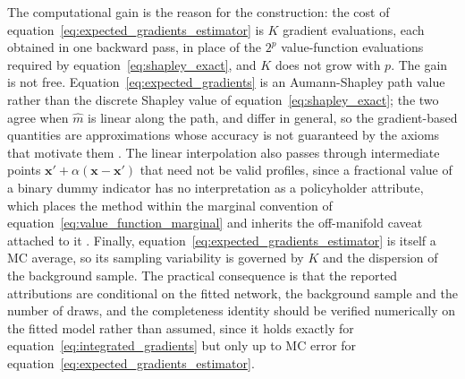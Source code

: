   \noindent
  The computational gain is the reason for the construction: the cost of
  equation~\eqref{eq:expected_gradients_estimator} is \(K\) gradient
  evaluations, each obtained in one backward pass, in place of the
  \(2^{p}\) value-function evaluations required by
  equation~\eqref{eq:shapley_exact}, and \(K\) does not grow with \(p\).
  The gain is not free. Equation~\eqref{eq:expected_gradients} is an
  Aumann-Shapley path value rather than the discrete Shapley value of
  equation~\eqref{eq:shapley_exact}; the two agree when \(\widehat{m}\) is
  linear along the path, and differ in general, so the gradient-based
  quantities are approximations whose accuracy is not guaranteed by the
  axioms that motivate them \citep{sundararajan2020many}. The linear
  interpolation also passes through intermediate points
  \(\mathbf{x}'+\alpha(\mathbf{x}-\mathbf{x}')\) that need not be valid
  profiles, since a fractional value of a binary dummy indicator has no
  interpretation as a policyholder attribute, which places the method
  within the marginal convention of
  equation~\eqref{eq:value_function_marginal} and inherits the
  off-manifold caveat attached to it \citep{hooker2021unrestricted}.
  Finally, equation~\eqref{eq:expected_gradients_estimator} is itself a MC
  average, so its sampling variability is governed by \(K\) and the
  dispersion of the background sample. The practical consequence is that
  the reported attributions are conditional on the fitted network, the
  background sample and the number of draws, and the completeness identity
  should be verified numerically on the fitted model rather than assumed,
  since it holds exactly for
  equation~\eqref{eq:integrated_gradients} but only up to MC error for
  equation~\eqref{eq:expected_gradients_estimator}.


